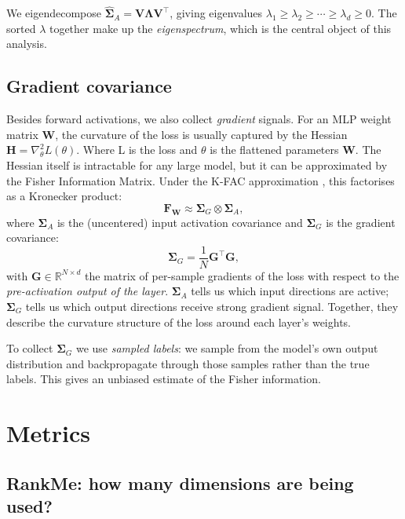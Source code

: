 \documentclass[11pt,a4paper]{article}
\newcommand{\R}{\mathbb{R}}
\newcommand{\kron}{\otimes}
\begin{document}
We eigendecompose $\hat{\bm{\Sigma}}_A = \mathbf{V}\bm{\Lambda}\mathbf{V}^\top$, giving eigenvalues $\lambda_1 \ge \lambda_2 \ge \cdots \ge \lambda_d \ge 0$.
The sorted $\lambda$ together make up the \emph{eigenspectrum}, which is the central object of this analysis.

\subsection{Gradient covariance}

Besides forward activations, we also collect \emph{gradient} signals.
For an MLP weight matrix $\mathbf{W}$, the curvature of the loss is usually captured by the Hessian $\mathbf{H} = \nabla_\theta^2 L(\theta)$. Where L is the loss and $\theta$ is the flattened parameters $\mathbf{W}$. The Hessian itself is intractable for any large model, but it can be approximated by the Fisher Information Matrix.
Under the K-FAC approximation \citep{martens2020optimizing}, this factorises as a Kronecker product:
\begin{equation}
  \mathbf{F}_{\mathbf{W}} \approx \bm{\Sigma}_G \kron \bm{\Sigma}_A,
\end{equation}
where $\bm{\Sigma}_A$ is the (uncentered) input activation covariance and $\bm{\Sigma}_G$ is the gradient covariance:
\begin{equation}
  \bm{\Sigma}_G = \frac{1}{N}\mathbf{G}^\top \mathbf{G},
\end{equation}
with $\mathbf{G} \in \R^{N \times d}$ the matrix of per-sample gradients of the loss with respect to the \emph{pre-activation output of the layer}.
$\bm{\Sigma}_A$ tells us which input directions are active; $\bm{\Sigma}_G$ tells us which output directions receive strong gradient signal.
Together, they describe the curvature structure of the loss around each layer's weights.

To collect $\bm{\Sigma}_G$ we use \emph{sampled labels}: we sample from the model's own output distribution and backpropagate through those samples rather than the true labels.
This gives an unbiased estimate of the Fisher information.

\section{Metrics}\label{sec:metrics}

\subsection{RankMe: how many dimensions are being used?}
\end{document}
